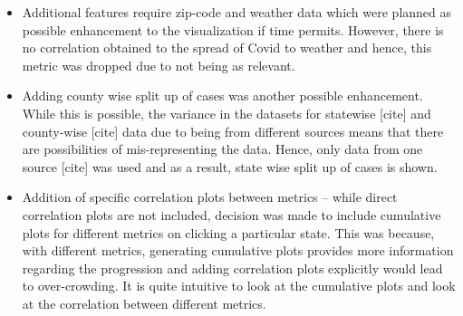 \begin{itemize}
\item Additional features require zip-code and weather data which were planned as possible enhancement to the visualization if time permits. However, there is no correlation obtained to the spread of Covid to weather and hence, this metric was dropped due to not being as relevant.
\item Adding county wise split up of cases was another possible enhancement. While this is possible, the variance in the datasets for statewise [cite] and county-wise [cite] data due to being from different sources means that there are possibilities of mis-representing the data. Hence, only data from one source [cite] was used and as a result, state wise split up of cases is shown.
\item Addition of specific correlation plots between metrics – while direct correlation plots are not included, decision was made to include cumulative plots for different metrics on clicking a particular state. This was because, with different metrics, generating cumulative plots provides more information regarding the progression and adding correlation plots explicitly would lead to over-crowding. It is quite intuitive to look at the cumulative plots and look at the correlation between different metrics.
\end{itemize}


